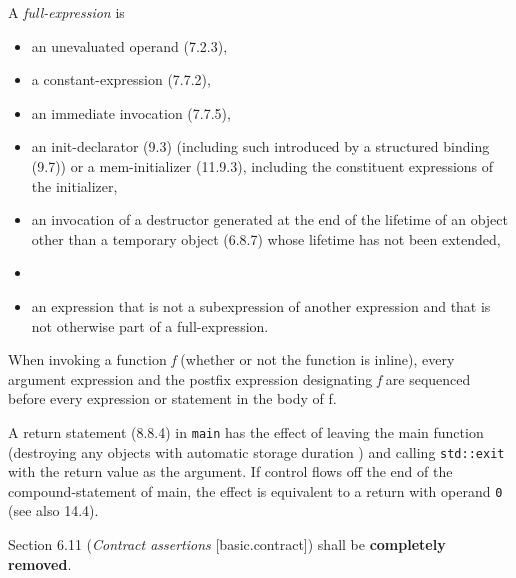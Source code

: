 \begin{modification}
A \emph{full-expression} is

\begin{itemize}[label=\textemdash]
\item
an unevaluated operand (7.2.3),

\item
a constant-expression (7.7.2),

\item
an immediate invocation (7.7.5),

\item
an init-declarator (9.3) (including such introduced by a structured binding (9.7)) or a mem-initializer
(11.9.3), including the constituent expressions of the initializer,

\item
an invocation of a destructor generated at the end of the lifetime of an object other than a temporary
object (6.8.7) whose lifetime has not been extended, 

\item
{}

\item
an expression that is not a subexpression of another expression and that is not otherwise part of a
full-expression.
\end{itemize}

\end{modification}

\begin{modification}
When invoking a function \emph{f} (whether or not the function is inline), every argument expression and the postfix
expression designating \emph{f} are sequenced before  every expression or statement in the body of f.
\end{modification}

\begin{modification}
A return statement (8.8.4) in \texttt{main} has the effect of leaving the main function (destroying any objects with
automatic storage duration ) and calling \texttt{std::exit} with
the return value as the argument. If control flows off the end of the compound-statement of main, the effect
is equivalent to a return with operand \texttt{0} (see also 14.4).
\end{modification}

\begin{removal}
Section 6.11 (\emph{Contract assertions} [basic.contract]) shall be \textbf{completely
removed}.
\end{removal}
